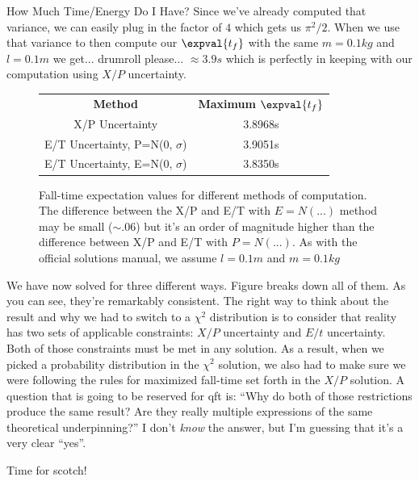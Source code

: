 \begin{answer}
\begin{answerpart}{How Much Time/Energy Do I Have?}
    Since we've already computed that variance, we can easily plug in
    the factor of $4$ which gets us $\pi^2/2$.  When we use that
    variance to then compute our $\expval{t_f}$ with the same
    $m=0.1kg$ and $l=0.1m$ we get... drumroll please... $\approx 3.9s$
    which is perfectly in keeping with our computation using $X/P$
    uncertainty.

    \begin{figure}
      \centering
      \begin{tabular}{cc}
        \textbf{Method} & \textbf{Maximum $\expval{t_f}$}\\
        X/P Uncertainty & 3.8968s\\
        E/T Uncertainty, P=N(0, $\sigma$) & 3.9051s\\
        E/T Uncertainty, E=N(0, $\sigma$) & 3.8350s\\
      \end{tabular}
      \caption{Fall-time expectation values for different methods of
        computation.  The difference between the X/P and E/T with
        $E=N(...)$ method may be small ($\sim .06$) but it's an order
        of magnitude higher than the difference between X/P and E/T
        with $P=N(...)$.  As with the official solutions manual, we
        assume $l=0.1m$ and $m=0.1kg$} 
    \end{figure}

    We have now solved for \icepick{} three different ways.  Figure
     breaks down all of them.  As you can see, they're
    remarkably consistent.  The right way to think about the result
    and why we had to switch to a $\chi^2$ distribution is to consider
    that reality has two sets of applicable constraints: $X/P$
    uncertainty and $E/t$ uncertainty.  Both of those constraints must
    be met in any solution.  As a result, when we picked a probability
    distribution in the $\chi^2$ solution, we also had to make sure we
    were following the rules for maximized fall-time set forth in the
    $X/P$ solution.  A question that is going to be reserved for
    \ac{qft} is: ``Why do both of those restrictions produce the same
    result?  Are they really multiple expressions of the same
    theoretical underpinning?''  I don't \emph{know} the answer, but
    I'm guessing that it's a very clear ``yes''.

    Time for scotch!
    
  \end{answerpart}

\end{answer}
